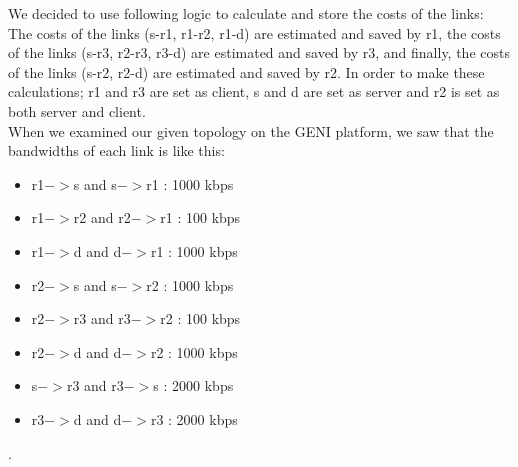 \documentclass[conference]{IEEEtran}
\begin{document}
We decided to use following logic to calculate and store the costs of the links: The costs of the links (s-r1, r1-r2, r1-d) are estimated and saved by r1, the costs of the links (s-r3, r2-r3, r3-d) are estimated and saved by r3, and finally, the costs of the links (s-r2, r2-d) are estimated and saved by r2. In order to make these calculations; r1 and r3 are set as client, s and d are set as server and r2 is set as both server and client. \\

When we examined our given topology on the GENI platform, we saw that the bandwidths of each link is like this:
\begin{itemize}
    \item r1$->$s and s$->$r1 : 1000 kbps
    \item r1$->$r2 and r2$->$r1 : 100 kbps
    \item r1$->$d and d$->$r1 : 1000 kbps
    \item r2$->$s and s$->$r2 : 1000 kbps
    \item r2$->$r3 and r3$->$r2 : 100 kbps
    \item r2$->$d and d$->$r2 : 1000 kbps
    \item s$->$r3 and r3$->$s : 2000 kbps
    \item r3$->$d and d$->$r3 : 2000 kbps
\end{itemize}.\\
\end{document}
